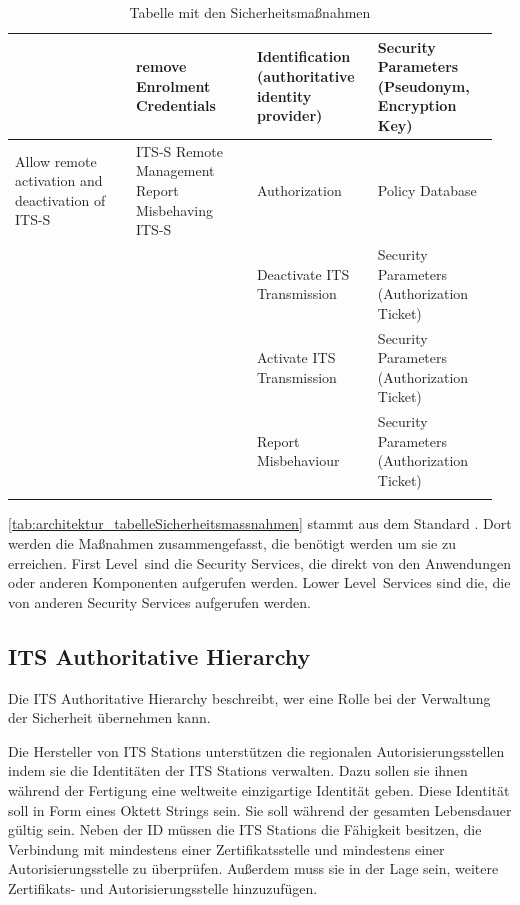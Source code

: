 \begin{longtable}{| p{0.24\linewidth} | p{0.24\linewidth} | p{0.24\linewidth} |p{0.24\linewidth}|}
\cline{2-4}
& remove Enrolment Credentials & Identification (authoritative identity provider) & Security Parameters (Pseudonym, Encryption Key)\\
\hline
Allow remote activation and deactivation of ITS-S & ITS-S Remote Management Report Misbehaving ITS-S & Authorization & Policy Database \\
\cline{3-4}
 & & Deactivate ITS Transmission & Security Parameters (Authorization Ticket) \\
 \cline{3-4}
& &  Activate ITS Transmission & Security Parameters (Authorization Ticket) \\
\cline{3-4}
& & Report Misbehaviour & Security Parameters (Authorization Ticket) \\
\hline 
\caption{Tabelle mit den Sicherheitsmaßnahmen \cite{ts102731}}
\label{tab:architektur_tabelleSicherheitsmassnahmen}
 
 \end{longtable}
\autoref{tab:architektur_tabelleSicherheitsmassnahmen} stammt aus dem Standard \cite{ts102731}. Dort werden die Maßnahmen zusammengefasst, die benötigt werden um sie zu erreichen. \glqq First Level\grqq~sind die Security Services, die direkt von den Anwendungen oder anderen Komponenten aufgerufen werden.  \glqq Lower Level\grqq~Services sind die, die von anderen Security Services aufgerufen werden.

\subsection{ITS Authoritative Hierarchy \label{architektur_itsAuthoriativeHierarchy}}
Die ITS Authoritative Hierarchy beschreibt, wer eine Rolle bei der Verwaltung der Sicherheit übernehmen kann. 

Die Hersteller von \ac{ITS} Stations unterstützen die regionalen Autorisierungsstellen indem sie die Identitäten der \ac{ITS} Stations verwalten. Dazu sollen sie ihnen während der Fertigung eine weltweite einzigartige Identität geben. Diese Identität soll  in Form eines Oktett Strings sein. Sie soll während der gesamten Lebensdauer gültig sein.
Neben der \ac{ID} müssen die \ac{ITS} Stations die Fähigkeit besitzen, die Verbindung mit mindestens einer Zertifikatsstelle und mindestens einer Autorisierungsstelle zu überprüfen.  Außerdem muss sie in der Lage sein, weitere Zertifikats- und Autorisierungsstelle hinzuzufügen.

